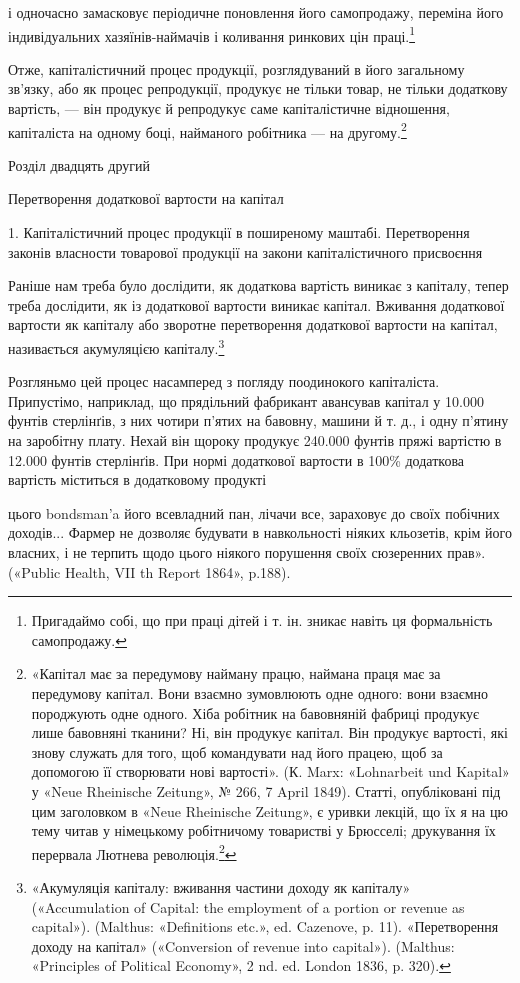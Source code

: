 і одночасно замасковує періодичне поновлення його самопродажу,
переміна його індивідуальних хазяїнів-наймачів і коливання
ринкових цін праці.\footnote{
Пригадаймо собі, що при праці дітей і т. ін. зникає навіть ця формальність
самопродажу.
}

Отже, капіталістичний процес продукції, розглядуваний в
його загальному зв’язку, або як процес репродукції, продукує
не тільки товар, не тільки додаткову вартість, — він продукує
й репродукує саме капіталістичне відношення, капіталіста на
одному боці, найманого робітника — на другому.\footnote{
«Капітал має за передумову найману працю, наймана праця має за передумову капітал. Вони взаємно
зумовлюють одне одного: вони взаємно породжують одне одного. Хіба робітник на бавовняній фабриці
продукує лише бавовняні тканини? Ні, він продукує капітал. Він продукує вартості, які знову служать
для того, щоб командувати над його працею, щоб за допомогою її створювати нові вартості». (К. Marx:
«Lohnarbeit und Kapital» у «Neue Rheinische Zeitung», № 266, 7 April 1849). Статті, опубліковані під
цим заголовком в «Neue Rheinische Zeitung», є уривки лекцій, що їх я на цю тему читав у німецькому
робітничому товаристві у Брюсселі; друкування їх перервала Лютнева
революція.\footnote*{
Статті ці з’явилися потім окремою брошурою і під тією ж назвою.
Є українське видання: Партвидав «Пролетар» 1932 р. \emph{Ред.}
}
}

Розділ двадцять другий

Перетворення додаткової вартости на капітал

1. Капіталістичний процес продукції в поширеному маштабі.
Перетворення законів власности товарової продукції на закони
капіталістичного присвоєння

Раніше нам треба було дослідити, як додаткова вартість виникає
з капіталу, тепер треба дослідити, як із додаткової вартости
виникає капітал. Вживання додаткової вартости як капіталу
або зворотне перетворення додаткової вартости на капітал, називається
акумуляцією капіталу.\footnote{
«Акумуляція капіталу: вживання частини доходу як капіталу» («Accumulation of Capital: the
employment of a portion or revenue as capital»). (Malthus: «Definitions etc.», ed. Cazenove, p. 11).
«Перетворення доходу на капітал» («Conversion of revenue into capital»).
(Malthus: «Principles of Political Economy», 2 nd. ed. London 1836, p. 320).
}

Розгляньмо цей процес насамперед з погляду поодинокого капіталіста. Припустімо, наприклад, що
прядільний фабрикант авансував капітал у 10.000 фунтів стерлінґів, з них чотири п’ятих на бавовну,
машини й т. д., і одну п’ятину на заробітну плату. Нехай він щороку продукує 240.000 фунтів пряжі
вартістю в 12.000 фунтів стерлінґів. При нормі додаткової вартости в 100\% додаткова вартість
міститься в додатковому продукті

цього bondsman’a його всевладний пан, лічачи все, зараховує до своїх побічних доходів... Фармер не
дозволяє будувати в навкольності ніяких кльозетів, крім його власних, і не терпить щодо цього
ніякого порушення своїх сюзеренних прав». («Public Health, VII th Report 1864», p.188).